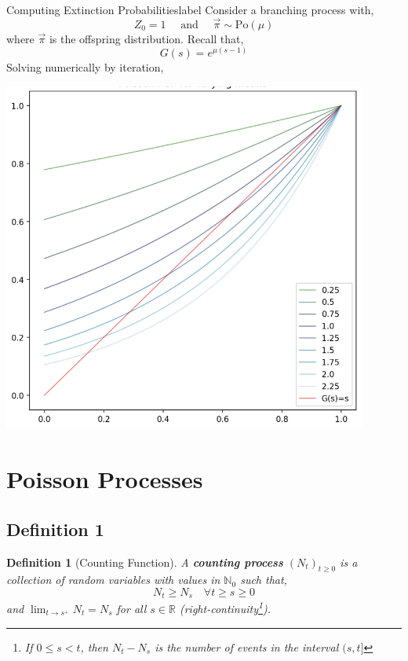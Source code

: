 \documentclass{tufte-handout}
\newtheorem{defn}[thm]{Definition}
\begin{document}
\begin{ex}{Computing Extinction Probabilities}{label}
  Consider a branching process with,
    \[Z_0 = 1 \quad \text{ and } \quad \Vec{\pi} \sim \text{Po}(\mu)\]
  where $\Vec{\pi}$ is the offspring distribution. Recall that,
  \[G(s) = e^{\mu(s - 1)}\]
  Solving  numerically by iteration,

  \vphantom{.}

\end{ex}

\begin{marginfigure}
  \begin{center}
      \includegraphics[width=0.9\textwidth]{fig-16.png}
      \caption{A Poisson probability generating function with various means $\mu$.}
    \end{center}
\end{marginfigure}

\section{Poisson Processes}
\subsection{Definition 1}
\begin{defn}[Counting Function]
  A \textbf{counting process} $(N_t)_{t \geq 0}$ is a collection of random variables with values in $\mathbb{N}_0$ such that,
  \[N_t \geq N_s \quad \forall t \geq s \geq 0\]
  \noindent and $\lim_{t \rightarrow s^+} N_t = N_s$ for all $s \in \mathbb{R}$ (right-continuity\footnote{If $0 \leq s < t$, then $N_t - N_s$ is the number of events in the interval $(s, t]$}).
\end{defn}
\end{document}
